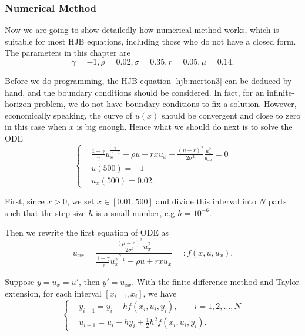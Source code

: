 \documentclass[a4paper]{article}
\theoremstyle{definition}
\numberwithin{equation}{section}
\begin{document}
\subsubsection{Numerical Method}
Now we are going to show detailedly how numerical method works, which is suitable for most HJB equations, including those who do not have a closed form. The parameters in this chapter are
$$\gamma=-1,\rho=0.02,\sigma=0.35,r=0.05,\mu=0.14.$$

Before we do programming, the HJB equation \eqref{hjb:merton3} can be deduced by hand, and the boundary conditions should be considered. In fact, for an infinite-horizon problem, we do not have boundary conditions to fix a solution. However, economically speaking, the curve of $u(x)$ should be convergent and close to zero in this case when $x$ is big enough. Hence what we should do next is to solve the ODE
\begin{equation}\label{ode:merton}
\left\{
\begin{aligned}
&\frac{1-\gamma}{\gamma}u_x^\frac{\gamma}{\gamma-1}-\rho u+rxu_x-\frac{(\mu-r)^2}{2\sigma^2}\frac{u_x^2}{u_{xx}}=0\\
&u(500)=-1\\
&u_x(500)=0.02.
\end{aligned}
\right.
\end{equation}

First, since $x>0$, we set $x\in[0.01,500]$ and divide this interval into $N$ parts such that the step size $h$ is a small number, e.g $h=10^{-6}$.

Then we rewrite the first equation of ODE as
$$u_{xx}=\frac{\frac{(\mu-r)^2}{2\sigma^2}u_x^2}{\frac{1-\gamma}{\gamma}u_x^\frac{\gamma}{\gamma-1}-\rho u+rxu_x}=:f(x,u,u_x).$$

Suppose $y=u_x=u'$, then $y'=u_{xx}$.
With the finite-difference method and Taylor extension, for each interval $[x_{i-1},x_i]$, we have
\begin{equation}\label{fdm:merton}
\left\{
\begin{aligned}
&y_{i-1}=y_i-hf(x_i,u_i,y_i),\qquad i=1,2,\dots,N\\
&u_{i-1}=u_i-hy_i+\frac{1}{2}h^2f(x_i,u_i,y_i).
\end{aligned}
\right.
\end{equation}
\end{document}
